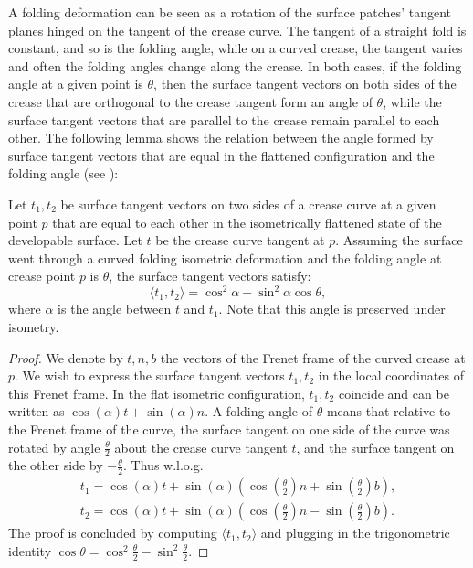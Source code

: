 A folding deformation can be seen as a rotation of the surface patches' tangent planes hinged on the tangent of the crease curve. The tangent of a straight fold is constant, and so is the folding angle, while on a curved crease, the tangent varies and often the folding angles change along the crease. In both cases, if the folding angle at a given point is $\theta$, then the surface tangent vectors on both sides of the crease that are orthogonal to the crease tangent form an angle of $\theta$, while the surface tangent vectors that are parallel to the crease remain parallel to each other. The following lemma shows the relation between the angle formed by surface tangent vectors that are equal in the flattened configuration and the folding angle (see ): 
 \begin{lemma}  \label{lem:tangents_dihedral}
 Let $t_1,t_2$ be surface tangent vectors on two sides of a crease curve at a given point $p$ that are equal to each other in the isometrically flattened state of the developable surface. Let $t$ be the crease curve tangent at $p$. Assuming the surface went through a curved folding isometric deformation and the folding angle at crease point $p$  is $\theta$, the surface tangent vectors satisfy:
\begin{equation} \label{eq:tangents_dihedral}
\langle t_1, t_2 \rangle = \cos^2\!\alpha + \sin^2\!\alpha \cos\theta, \end{equation}
where $\alpha$ is the angle between $t$ and $t_1$. Note that this angle is preserved under isometry.
\end{lemma}
\begin{proof}{We denote by $t,n,b$ the vectors of the Frenet frame of the curved crease at $p$. We wish to express the surface tangent vectors $t_1, t_2$ in the local coordinates of this Frenet frame. In the flat isometric configuration, $t_1, t_2$ coincide and can be written as $\cos(\alpha)t + \sin(\alpha)n$. A folding angle of $\theta$ means that relative to the Frenet frame of the curve, the surface tangent on one side of the curve was rotated by angle $\frac{\theta}{2}$ about the crease curve tangent $t$, and the surface tangent on the other side by  $-\frac{\theta}{2}$. 
%
Thus w.l.o.g.\ 
\begin{align*}
\textstyle t_1 = \cos(\alpha)t + \sin(\alpha)\left(\cos\left(\frac{\theta}{2}\right)n + \sin\left(\frac{\theta}{2}\right)b\right),\\
\textstyle t_2 = \cos(\alpha)t + \sin(\alpha)\left(\cos\left(\frac{\theta}{2}\right)n - \sin\left(\frac{\theta}{2}\right)b\right). 
\end{align*}
%
The proof is concluded by computing $\langle t_1,t_2 \rangle$ and plugging in the trigonometric identity $\cos\theta = \cos^2{\frac{\theta}{2}}-\sin^2\frac{\theta}{2}$.}\end{proof}

